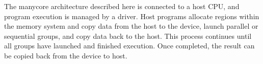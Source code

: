 The manycore architecture described here is connected to a host	CPU, and
program execution is managed by a driver. Host programs	allocate
regions within the memory system and copy data from the host to the device,
launch parallel or sequential groups, and copy data back to the	host.
This process continues until all groups have launched and finished
execution. Once completed, the result can be copied back from the device
to host.